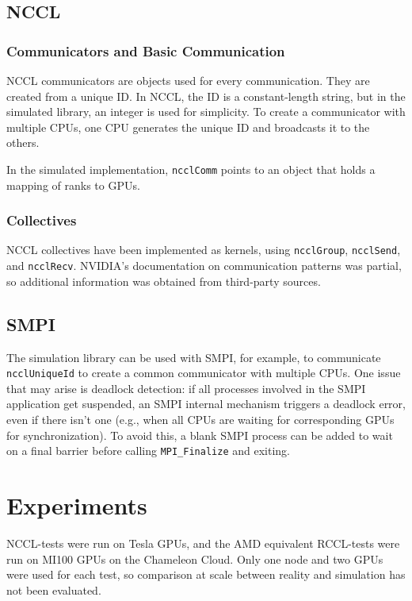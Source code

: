\documentclass[11pt,a4paper]{article}
\begin{document}
\subsection{NCCL}
\subsubsection{Communicators and Basic Communication}
NCCL communicators are objects used for every communication. They are created from a 
unique ID. In NCCL, the ID is a constant-length string, but in the simulated library, 
an integer is used for simplicity. To create a communicator with multiple CPUs, one CPU 
generates the unique ID and broadcasts it to the others.

In the simulated implementation, \texttt{ncclComm} points to an object that holds a 
mapping of ranks to GPUs.

\subsubsection{Collectives}
NCCL collectives have been implemented as kernels, using \texttt{ncclGroup}, 
\texttt{ncclSend}, and \texttt{ncclRecv}. NVIDIA's documentation on communication 
patterns was partial, so additional information was obtained from third-party sources.

\subsection{SMPI}
The simulation library can be used with SMPI, for example, to communicate 
\texttt{ncclUniqueId} to create a common communicator with multiple CPUs. One issue 
that may arise is deadlock detection: if all processes involved in the SMPI 
application get suspended, an SMPI internal mechanism triggers a deadlock error, even 
if there isn't one (e.g., when all CPUs are waiting for corresponding GPUs for 
synchronization). To avoid this, a blank SMPI process can be added to wait on a final 
barrier before calling \texttt{MPI\_Finalize} and exiting.

\section{Experiments}
NCCL-tests were run on Tesla GPUs, and the AMD equivalent RCCL-tests were run on 
MI100 GPUs on the Chameleon Cloud. Only one node and two GPUs were used for each test, 
so comparison at scale between reality and simulation has not been evaluated.
\end{document}
